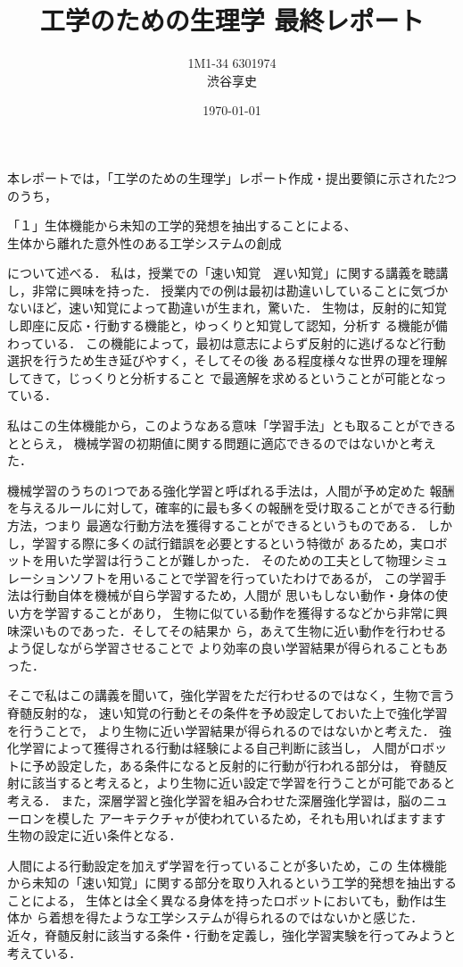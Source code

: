 \documentclass[a4paper,11pt]{jsarticle}
\begin{document}
\title{工学のための生理学 最終レポート}
\author{1M1-34 6301974\\渋谷享史}
\date{\today}
\maketitle


本レポートでは，「工学のための生理学」レポート作成・提出要領に示された2つのうち，
\begin{center}
  「１」生体機能から未知の工学的発想を抽出することによる、\\
  生体から離れた意外性のある工学システムの創成
  \end{center}
  

について述べる．
\newpage
私は，授業での「速い知覚　遅い知覚」に関する講義を聴講し，非常に興味を持った．
授業内での例は最初は勘違いしていることに気づかないほど，速い知覚によって勘違いが生まれ，驚いた．
生物は，反射的に知覚し即座に反応・行動する機能と，ゆっくりと知覚して認知，分析す
る機能が備わっている．
この機能によって，最初は意志によらず反射的に逃げるなど行動
選択を行うため生き延びやすく，そしてその後
ある程度様々な世界の理を理解してきて，じっくりと分析すること
で最適解を求めるということが可能となっている．
\par 私はこの生体機能から，このようなある意味「学習手法」とも取ることができるととらえ，
機械学習の初期値に関する問題に適応できるのではないかと考えた．\par
機械学習のうちの1つである強化学習と呼ばれる手法は，人間が予め定めた
報酬を与えるルールに対して，確率的に最も多くの報酬を受け取ることができる行動方法，つまり
最適な行動方法を獲得することができるというものである．
しかし，学習する際に多くの試行錯誤を必要とするという特徴が
あるため，実ロボットを用いた学習は行うことが難しかった．
そのための工夫として物理シミュレーションソフトを用いることで学習を行っていたわけであるが，
この学習手法は行動自体を機械が自ら学習するため，人間が
思いもしない動作・身体の使い方を学習することがあり，
生物に似ている動作を獲得するなどから非常に興味深いものであった．そしてその結果か
ら，あえて生物に近い動作を行わせるよう促しながら学習させることで
より効率の良い学習結果が得られることもあった．
\par
そこで私はこの講義を聞いて，強化学習をただ行わせるのではなく，生物で言う脊髄反射的な，
速い知覚の行動とその条件を予め設定しておいた上で強化学習を行うことで，
より生物に近い学習結果が得られるのではないかと考えた．
強化学習によって獲得される行動は経験による自己判断に該当し，
人間がロボットに予め設定した，ある条件になると反射的に行動が行われる部分は，
脊髄反射に該当すると考えると，より生物に近い設定で学習を行うことが可能であると考える．
また，深層学習と強化学習を組み合わせた深層強化学習は，脳のニューロンを模した
アーキテクチャが使われているため，それも用いればますます生物の設定に近い条件となる．
\par
人間による行動設定を加えず学習を行っていることが多いため，この
生体機能から未知の「速い知覚」に関する部分を取り入れるという工学的発想を抽出することによる，
生体とは全く異なる身体を持ったロボットにおいても，動作は生体か
ら着想を得たような工学システムが得られるのではないかと感じた．
近々，脊髄反射に該当する条件・行動を定義し，強化学習実験を行ってみようと考えている．
\end{document}
